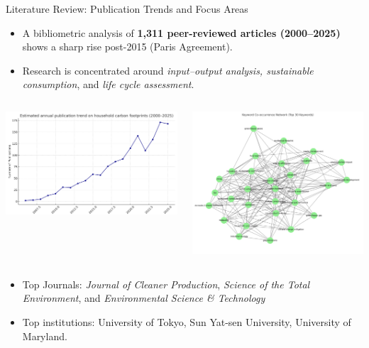 \documentclass{beamer}
\begin{document}
\begin{frame}{Literature Review: Publication Trends and Focus Areas}
\small
\vspace{-2.5em}
\begin{itemize}
  \footnotesize
  \item A bibliometric analysis of \textbf{1,311 peer-reviewed articles (2000–2025)} shows a sharp rise post-2015 (Paris Agreement).
  \pause
  \item Research is concentrated around \textit{input–output analysis, sustainable consumption}, and \textit{life cycle assessment}.
  \end{itemize}
\vspace{-1.0em}
\begin{columns}
  \centering
  \begin{column}{0.5\textwidth}
    \centering
    \includegraphics[width=0.8\linewidth]{publication_trend_darkblue_estimated2025.png}
  \end{column}
  \begin{column}{0.6\textwidth}
    \centering
    \includegraphics[width=0.7\linewidth]{keyword_cooccurrence.png}
  \end{column}
\end{columns}
\pause
\vspace{-0.5em}
\begin{itemize}
  \footnotesize
\item Top Journals: \textit{Journal of Cleaner Production}, \textit{Science of the Total Environment}, and \textit{Environmental Science \& Technology}
  \item Top institutions: University of Tokyo, Sun Yat-sen University, University of Maryland.
\end{itemize}

\end{frame}
\end{document}
